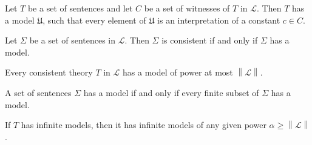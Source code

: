 \documentclass[../../main.tex]{subfiles}
\begin{document}
\begin{lemma}\cite[Lemma 2.1.2]{Cha90}
    Let $T$ be a set of sentences and let $C$ be a set of witnesses of $T$ in $\mathcal{L}$.
    Then $T$ has a model $\mathfrak{U}$, such that every element of $\mathfrak{U}$ is an interpretation of a constant $c \in C$.
\end{lemma} 

\begin{theorem}\cite[Theorem 1.3.21]{Cha90}
    Let $\Sigma$ be a set of sentences in $\mathcal{L}$.
    Then $\Sigma$ is consistent if and only if $\Sigma$ has a model.
\end{theorem}

\begin{theorem}\cite[Corollary 2.1.4]{Cha90}
    Every consistent theory $T$ in $\mathcal{L}$ has a model of power at most $\left\lVert \mathcal{L} \right\rVert$.
\end{theorem}

\begin{theorem}\cite[Theorem 1.3.22]{Cha90}
    A set of sentences $\Sigma$ has a model if and only if every finite subset of $\Sigma$ has a model.
\end{theorem}

\begin{theorem}\cite[Corollary 2.1.6]{Cha90}
    If $T$ has infinite models, then it has infinite models of any given power $\alpha \geq \left\lVert \mathcal{L} \right\rVert$.
\end{theorem}
\end{document}
